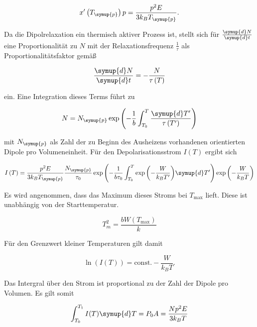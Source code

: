 \begin{equation*}
    x'\left(T_{\symup{p}}\right)p = \frac{p^2 E}{3k_B T_{\symup{p}}}.
\end{equation*}

Da die Dipolrelaxation ein thermisch aktiver Prozess ist, stellt sich für $\frac{\symup{d}N}{\symup{d}t}$ eine Proportionalität zu $N$ mit der Relaxationsfrequenz 
$\frac{1}{\tau}$ als Proportionalitätsfaktor gemäß 

\begin{equation*}
    \frac{\symup{d}N}{\symup{d}t} = -\frac{N}{\tau\left(T\right)}
\end{equation*}

ein. Eine Integration dieses Terms führt zu 

\begin{equation*}
    N = N_{\symup{p}}\exp{\left(-\frac{1}{b}\int_{T_0}^{T}\frac{\symup{d}T'}{\tau\left(T'\right)}\right)}
\end{equation*}

mit $N_{\symup{p}}$ als Zahl der zu Beginn des Ausheizens vorhandenen orientierten Dipole pro Volumeneinheit. Für den Depolarisationsstrom $I(T)$ ergibt sich

\begin{equation}
    \label{eqn:exp}
    I\left(T\right) = \frac{p^2E}{3k_B T_{\symup{p}}}\frac{N_{\symup{p}}}{\tau_0} \exp{\left(-\frac{1}{b\tau_0}\int_{T_0}^{T}\exp{\left(-\frac{W}{k_B T'}\right)}\symup{d}T'\right)}\exp{\left(-\frac{W}{k_B T}\right)}
\end{equation}

Es wird angenommen, dass das Maximum dieses Stroms bei $T_{\text{max}}$ lieft. Diese ist unabhängig von der Starttemperatur.

\begin{equation*}
    T_m^2 = \frac{bW\left(T_{\text{max}}\right)}{k}
\end{equation*}

Für den Grenzwert kleiner Temperaturen gilt damit 

\begin{equation*}
    \ln{\left(I\left(T\right)\right)} = \text{const.}-\frac{W}{k_B T }.
\end{equation*}

Das Intergral über den Strom ist proportional zu der Zahl der Dipole pro Volumen. Es gilt somit 

\begin{equation*}
    \int_{T_0}^{T_1} I(T)\symup{d}T = P_0 A = \frac{Np^2E}{3k_B T}
\end{equation*}

